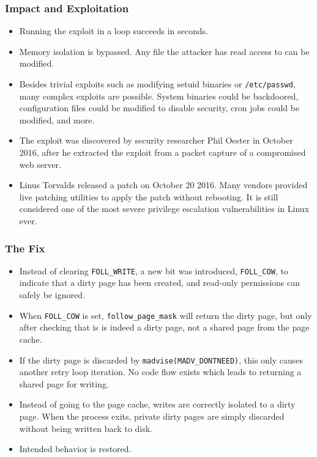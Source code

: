 \documentclass{beamer}
\newcommand{\code}[1]{\texttt{#1}}
\begin{document}
\begin{frame}
\frametitle{Impact and Exploitation}
\begin{itemize}

\item
Running the exploit in a loop succeeds in seconds.

\item
Memory isolation is bypassed. Any file the attacker has read access to can be modified.

\item
Besides trivial exploits such as modifying setuid binaries or \code{/etc/passwd}, many complex exploits are possible.
System binaries could be backdoored, configuration files could be modified to disable security, cron jobs could be modified, and more.

\item
The exploit was discovered by security researcher Phil Oester in October 2016, after he extracted the exploit from a packet capture of a compromised web server.

\item
Linus Torvalds released a patch on October 20 2016. Many vendors provided live patching utilities to apply the patch without rebooting.
It is still considered one of the most severe privilege escalation vulnerabilities in Linux ever.

\end{itemize}
\end{frame}

\begin{frame}
\frametitle{The Fix}
\begin{itemize}

\item
Instead of clearing \code{FOLL\_WRITE}, a new bit was introduced, \code{FOLL\_COW}, to indicate that a dirty page has been created, and read-only permissions can safely be ignored.

\item
When \code{FOLL\_COW} is set, \code{follow\_page\_mask} will return the dirty page, but only after checking that is is indeed a dirty page, not a shared page from the page cache.

\item
If the dirty page is discarded by \code{madvise(MADV\_DONTNEED)}, this only causes another retry loop iteration.
No code flow exists which leads to returning a shared page for writing.

\item
Instead of going to the page cache, writes are correctly isolated to a dirty page.
When the process exits, private dirty pages are simply discarded without being written back to disk.

\item
Intended behavior is restored.

\end{itemize}
\end{frame}
\end{document}
